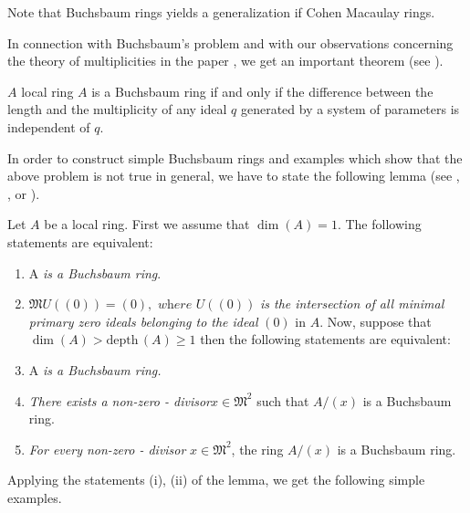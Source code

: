 Note that Buchsbaum rings yields a generalization if Cohen Macau\-lay rings.

In connection with Buchsbaum's problem and with our observations
concerning the theory of multiplicities in the paper \cite{82}, we get an
important theorem (see \cite{82}). 

\setcounter{theorem}{7}
\begin{theorem}\label{chap0:sec1:thm8}
  $A$ local ring $A$ is a Buchsbaum ring if and only if the
  difference between the length and the multiplicity of any ideal $q$
  generated by a system of parameters is independent of $q$. 
  
  In order to construct simple Buchsbaum rings and examples which show
  that the above problem is not true in general, we have to state the
  following lemma (see \cite{82}, \cite{87}, or \cite{97}). 
\end{theorem}

\setcounter{lemma}{8}
\begin{lemma}\label{chap0:sec1:lem0.9}
  Let $A$ be a local ring. First we assume that $\dim (A)
  =1$. The following statements are equivalent: 
    \begin{enumerate}[\rm (i)]
    \item A \textit {is a Buchsbaum ring}.
    \item $\mathfrak{M} U ((0)) = (0), \textit { where } U((0))$ \textit{is  the
      intersection of all minimal primary zero ideals belonging to the ideal}
      $(0)$ in $A$. Now, suppose that $\dim (A) > \text{depth}\, (A) \ge 1$ then
      the following statements are equivalent: 
    \item A \textit {is a Buchsbaum ring.}
    \item \textit{There exists a non-zero - divisor}\pageoriginale $x \in \mathfrak{M}^2$ such
      that $A/(x)$ is a Buchsbaum ring. 
    \item \textit{For every non-zero - divisor} $x \in \mathfrak{M}^2$, the ring
      $A/(x)$ is a Buchsbaum ring.
    \end{enumerate}
\end{lemma}
Applying the statements (i), (ii) of the lemma, we get the following
simple examples. 

